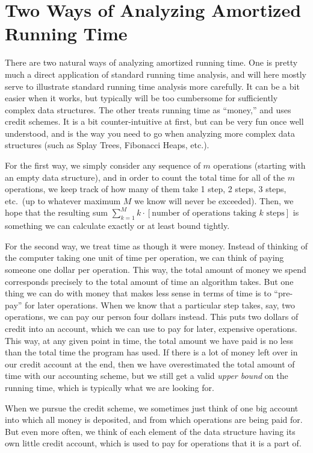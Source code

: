 \section{Two Ways of Analyzing Amortized Running Time}

There are two natural ways of analyzing amortized running time.
One is pretty much a direct application of standard running time analysis,
and will here mostly serve to illustrate standard running time
analysis more carefully.
It can be a bit easier when it works, but typically will be too
cumbersome for sufficiently complex data structures.
The other treats running time as ``money,'' and uses credit schemes.
It is a bit counter-intuitive at first, but can be very fun once well understood,
and is the way you need to go when analyzing more complex data
structures (such as Splay Trees, Fibonacci Heaps, etc.).

For the first way, we simply consider any sequence of $m$ operations
(starting with an empty data structure),
and in order to count the total time for all of the $m$ operations,
we keep track of how many of them take 1 step, 2 steps, 3 steps,
etc.~(up to whatever maximum $M$ we know will never be exceeded).
Then, we hope that the resulting sum 
$\sum_{k=1}^M k \cdot [\mbox{number of operations taking $k$ steps}]$
is something we can calculate exactly or at least bound tightly.

For the second way, we treat time as though it were money.
Instead of thinking of the computer taking one unit of time per operation,
we can think of paying someone one dollar per operation.
This way, the total amount of money we spend corresponds precisely to
the total amount of time an algorithm takes.
But one thing we can do with money that makes less sense in terms of
time is to ``pre-pay'' for later operations.
When we know that a particular step takes, say, two operations, we can
pay our person four dollars instead.
This puts two dollars of credit into an account,
which we can use to pay for later, expensive operations.
This way, at any given point in time, the total amount we have paid is
no less than the total time the program has used.
If there is a lot of money left over in our credit account at the end,
then we have overestimated the total amount of time with our
accounting scheme, but we still get a valid \emph{upper bound} on 
the running time, which is typically what we are looking for.

When we pursue the credit scheme, we sometimes just think of one big
account into which all money is deposited, and from which operations
are being paid for. But even more often, we think of each element of
the data structure having its own little credit account, which is used
to pay for operations that it is a part of.


